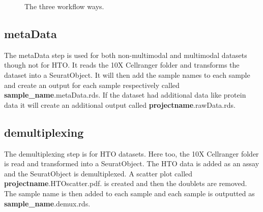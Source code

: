 \begin{figure}[h!]
	\centering
	\caption{The three workflow ways.}
	\label{fig:pipelineRun}
\end{figure}

\subsection{metaData}
The metaData step is used for both non-multimodal and multimodal datasets though not for HTO. It reads the 10X Cellranger folder and transforms the dataset into a SeuratObject. It will then add the sample names to each sample and create an output for each sample respectively called \textbf{sample\_name}.metaData.rds. If the dataset had additional data like protein data it will create an additional output called \textbf{projectname}.rawData.rds.

\subsection{demultiplexing}
The demultiplexing step is for HTO datasets. Here too, the 10X Cellranger folder is read and transformed into a SeuratObject. The HTO data is added as an assay and the SeuratObject is demultiplexed. A scatter plot called \textbf{projectname}.HTOscatter.pdf. is created and then the doublets are removed. The sample name is then added to each sample and each sample is outputted as \textbf{sample\_name}.demux.rds.

